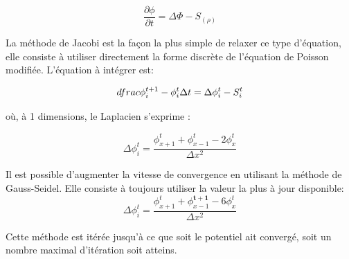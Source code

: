 \begin{equation}
\dfrac{\partial \phi}{\partial t} = \Delta \Phi -S_{(\rho)}
\end{equation}

La méthode de Jacobi est la façon la plus simple de relaxer ce type d'équation, elle consiste à utiliser directement la forme discrète de l'équation de Poisson modifiée. 
L'équation à intégrer est:

\begin{equation}
\\dfrac{\phi^{t+1}_i - \phi^{t}_i}{\Delta t}  =  \Delta \phi_i^t - S_i^t
\end{equation}

où, à 1 dimensions, le Laplacien s'exprime :

\begin{equation}
\Delta \phi_i^t = \dfrac{\phi_{x+1}^t  + \phi_{x-1}^t- 2\phi_{x}^t}{\Delta x ^2}
\end{equation}
		


Il est possible d'augmenter la vitesse de convergence en utilisant la méthode de Gauss-Seidel.
Elle consiste à toujours utiliser la valeur la plus à jour disponible:
\begin{equation}
\Delta \phi_i^t = \dfrac{\phi_{x+1}^t  + \phi_{x-1}^\mathbf{t+1}- 6\phi_{x}^t}{\Delta x ^2}
\end{equation}

Cette méthode est itérée jusqu'à ce que soit le potentiel ait convergé, soit un nombre maximal d'itération soit atteins.


